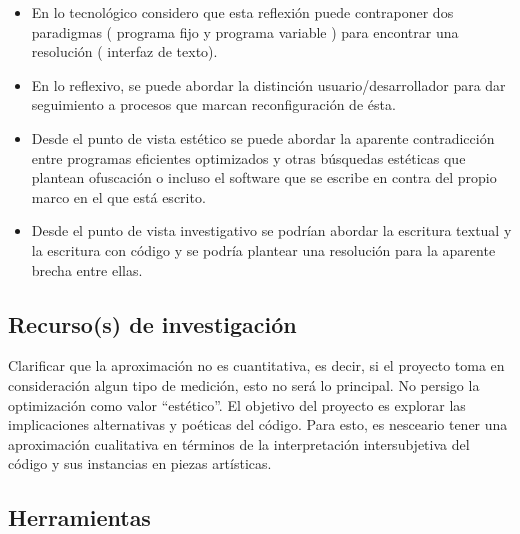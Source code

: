 
\begin{itemize}

\item En lo tecnológico considero que esta reflexión puede contraponer dos paradigmas ( programa fijo y programa variable ) para encontrar una resolución ( interfaz de texto).  

\item En lo reflexivo, se puede abordar la distinción usuario/desarrollador para dar seguimiento a procesos que marcan reconfiguración de ésta.

\item Desde el punto de vista estético se puede abordar la aparente contradicción entre programas eficientes optimizados y otras búsquedas estéticas que plantean ofuscación o incluso el software que se escribe en contra del propio marco en el que está escrito.

\item Desde el punto de vista investigativo se podrían abordar la escritura textual y la escritura con código y se podría plantear una resolución para la aparente brecha entre ellas.

\end{itemize}

\subsection{Recurso(s) de investigación}

Clarificar que la aproximación no es cuantitativa, es decir, si el proyecto toma en consideración algun tipo de medición, esto no será lo principal. No persigo la optimización como valor ``estético''. El objetivo del proyecto es explorar las implicaciones alternativas y poéticas del código. Para esto, es nesceario tener una aproximación cualitativa en términos de la interpretación intersubjetiva del código y sus instancias en piezas artísticas. 



\subsection{Herramientas}

